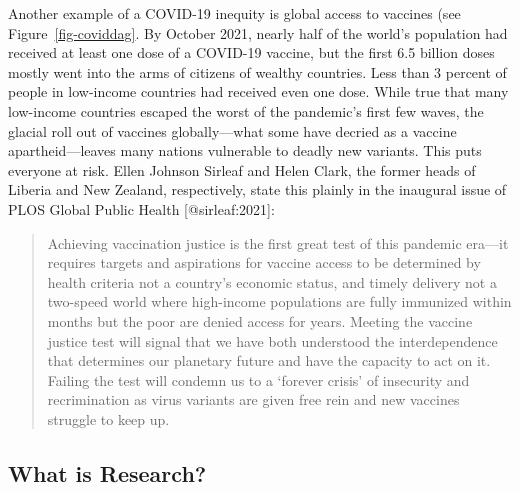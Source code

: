 \documentclass[
  letterpaper,
  DIV=11,
  numbers=noendperiod,
  oneside]{scrartcl}
\begin{document}
Another example of a COVID-19 inequity is global access to vaccines (see
Figure~\ref{fig-coviddag}. By October 2021, nearly half of the world's
population had received at least one dose of a COVID-19 vaccine, but the
first 6.5 billion doses mostly went into the arms of citizens of wealthy
countries. Less than 3 percent of people in low-income countries had
received even one dose. While true that many low-income countries
escaped the worst of the pandemic's first few waves, the glacial roll
out of vaccines globally---what some have decried as a vaccine
apartheid---leaves many nations vulnerable to deadly new variants. This
puts everyone at risk. Ellen Johnson Sirleaf and Helen Clark, the former
heads of Liberia and New Zealand, respectively, state this plainly in
the inaugural issue of PLOS Global Public Health {[}@sirleaf:2021{]}:

\begin{quote}
Achieving vaccination justice is the first great test of this pandemic
era---it requires targets and aspirations for vaccine access to be
determined by health criteria not a country's economic status, and
timely delivery not a two-speed world where high-income populations are
fully immunized within months but the poor are denied access for years.
Meeting the vaccine justice test will signal that we have both
understood the interdependence that determines our planetary future and
have the capacity to act on it. Failing the test will condemn us to a
`forever crisis' of insecurity and recrimination as virus variants are
given free rein and new vaccines struggle to keep up.
\end{quote}

\hypertarget{what-is-research}{%
\subsection{What is Research?}\label{what-is-research}}

\end{document}
